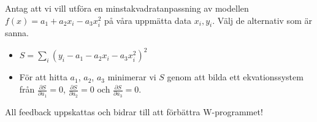 \documentclass[9pt]{beamer}
\begin{document}
\begin{frame}{}
    Antag att vi vill utföra en minstakvadratanpassning av modellen $f(x) = a_1 + a_2x_i - a_3x_i^2$ på våra uppmätta data ${x_i, y_i}$. Välj de alternativ som är sanna.
    \begin{itemize}
        \item $S = \sum\limits_i \left( y_i - a_1 - a_2x_i - a_3x_i^2\right)^2$
        \item För att hitta $a_1$, $a_2$, $a_3$ minimerar vi $S$ genom att bilda ett ekvationssystem från $\frac{\partial S}{\partial a_1} = 0$, $\frac{\partial S}{\partial a_2} = 0$ och $\frac{\partial S}{\partial a_3} = 0$.
    \end{itemize}
\end{frame}

\begin{frame}{}
    \begin{center}
        All feedback uppskattas och bidrar till att förbättra W-programmet!
    \end{center}
    
\end{frame}
\end{document}
